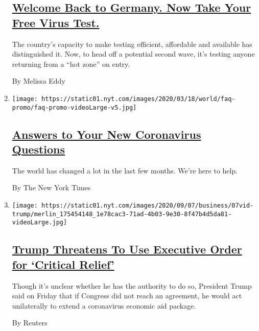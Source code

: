 \begin{enumerate}
  \hypertarget{welcome-back-to-germany-now-take-your-free-virus-test}{%
  \subsection{\texorpdfstring{\href{/2020/08/05/world/europe/germany-coronavirus-test-travelers.html}{Welcome
  Back to Germany. Now Take Your Free Virus
  Test.}}{Welcome Back to Germany. Now Take Your Free Virus Test.}}\label{welcome-back-to-germany-now-take-your-free-virus-test}}

  The country's capacity to make testing efficient, affordable and
  available has distinguished it. Now, to head off a potential second
  wave, it's testing anyone returning from a ``hot zone'' on entry.

  By Melissa Eddy
\item
  \texttt{[image: https://static01.nyt.com/images/2020/03/18/world/faq-promo/faq-promo-videoLarge-v5.jpg]}

  \hypertarget{answers-to-your-new-coronavirus-questions}{%
  \subsection{\texorpdfstring{\href{/interactive/2020/world/coronavirus-tips-advice.html}{Answers
  to Your New Coronavirus
  Questions}}{Answers to Your New Coronavirus Questions}}\label{answers-to-your-new-coronavirus-questions}}

  The world has changed a lot in the last few months. We're here to
  help.

  By The New York Times
\item
  \texttt{[image: https://static01.nyt.com/images/2020/09/07/business/07vid-trump/merlin\_175454148\_1e78cac3-71ad-4b03-9e30-8f47b4d5da81-videoLarge.jpg]}

  \hypertarget{trump-threatens-to-use-executive-order-for-critical-relief}{%
  \subsection{\texorpdfstring{\href{/video/us/politics/100000007279339/trump-says-he-will-act-on-his-own-if-congress-doesnt-agree-on-relief.html}{Trump
  Threatens To Use Executive Order for `Critical
  Relief'}}{Trump Threatens To Use Executive Order for `Critical Relief'}}\label{trump-threatens-to-use-executive-order-for-critical-relief}}

  Though it's unclear whether he has the authority to do so, President
  Trump said on Friday that if Congress did not reach an agreement, he
  would act unilaterally to extend a coronavirus economic aid package.

  By Reuters
\end{enumerate}

